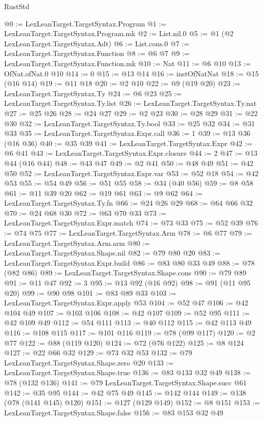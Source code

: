 \begin{lexlean}{RustStd}
\begin{coremodule}
@0 := LexLeanTarget.TargetSyntax.Program
@1 := LexLeanTarget.TargetSyntax.Program.mk
@2 := List.nil.{0}
@5 := @1 (@2 LexLeanTarget.TargetSyntax.Adt)
@6 := List.cons.{0}
@7 := LexLeanTarget.TargetSyntax.Function
@8 := @6 @7
@9 := LexLeanTarget.TargetSyntax.Function.mk
@10 := Nat
@11 := @6 @10
@13 := OfNat.ofNat.{0} @10
@14 := 0
@15 := @13 @14
@16 := instOfNatNat
@18 := @15 (@16 @14)
@19 := @11 @18
@20 := @2 @10
@22 := @9 (@19 @20)
@23 := LexLeanTarget.TargetSyntax.Ty
@24 := @6 @23
@25 := LexLeanTarget.TargetSyntax.Ty.list
@26 := LexLeanTarget.TargetSyntax.Ty.nat
@27 := @25 @26
@28 := @24 @27
@29 := @2 @23
@30 := @28 @29
@31 := @22 @30
@32 := LexLeanTarget.TargetSyntax.Ty.bool
@33 := @25 @32
@34 := @31 @33
@35 := LexLeanTarget.TargetSyntax.Expr.call
@36 := 1
@39 := @13 @36 (@16 @36)
@40 := @35 @39
@41 := LexLeanTarget.TargetSyntax.Expr
@42 := @6 @41
@43 := LexLeanTarget.TargetSyntax.Expr.closure
@44 := 2
@47 := @13 @44 (@16 @44)
@48 := @43 @47
@49 := @2 @41
@50 := @48 @49
@51 := @42 @50
@52 := LexLeanTarget.TargetSyntax.Expr.var
@53 := @52 @18
@54 := @42 @53
@55 := @54 @49
@56 := @51 @55
@58 := @34 (@40 @56)
@59 := @8 @58
@61 := @11 @39 @20
@62 := @19 @61
@63 := @9 @62
@64 := LexLeanTarget.TargetSyntax.Ty.fn
@66 := @24 @26 @29
@68 := @64 @66 @32
@70 := @24 @68 @30
@72 := @63 @70 @33
@73 := LexLeanTarget.TargetSyntax.Expr.match
@74 := @73 @33
@75 := @52 @39
@76 := @74 @75
@77 := LexLeanTarget.TargetSyntax.Arm
@78 := @6 @77
@79 := LexLeanTarget.TargetSyntax.Arm.arm
@80 := LexLeanTarget.TargetSyntax.Shape.nil
@82 := @79 @80 @20
@83 := LexLeanTarget.TargetSyntax.Expr.build
@86 := @83 @80 @33 @49
@88 := @78 (@82 @86)
@89 := LexLeanTarget.TargetSyntax.Shape.cons
@90 := @79 @89
@91 := @11 @47
@92 := 3
@95 := @13 @92 (@16 @92)
@98 := @91 (@11 @95 @20)
@99 := @90 @98
@101 := @83 @89 @33
@103 := LexLeanTarget.TargetSyntax.Expr.apply @53
@104 := @52 @47
@106 := @42 @104 @49
@107 := @103 @106
@108 := @42 @107
@109 := @52 @95
@111 := @42 @109 @49
@112 := @54 @111
@113 := @40 @112
@115 := @42 @113 @49
@116 := @108 @115
@117 := @101 @116
@119 := @78 (@99 @117)
@120 := @2 @77
@122 := @88 (@119 @120)
@124 := @72 (@76 @122)
@125 := @8 @124
@127 := @22 @66 @32
@129 := @73 @32 @53
@132 := @79 LexLeanTarget.TargetSyntax.Shape.zero @20
@133 := LexLeanTarget.TargetSyntax.Shape.true
@136 := @83 @133 @32 @49
@138 := @78 (@132 @136)
@141 := @79 LexLeanTarget.TargetSyntax.Shape.succ @61
@142 := @35 @95
@144 := @42 @75 @49
@145 := @142 @144
@149 := @138 (@78 (@141 @145) @120)
@151 := @127 (@129 @149)
@152 := @8 @151
@153 := LexLeanTarget.TargetSyntax.Shape.false
@156 := @83 @153 @32 @49

\end{coremodule}
\end{lexlean}
